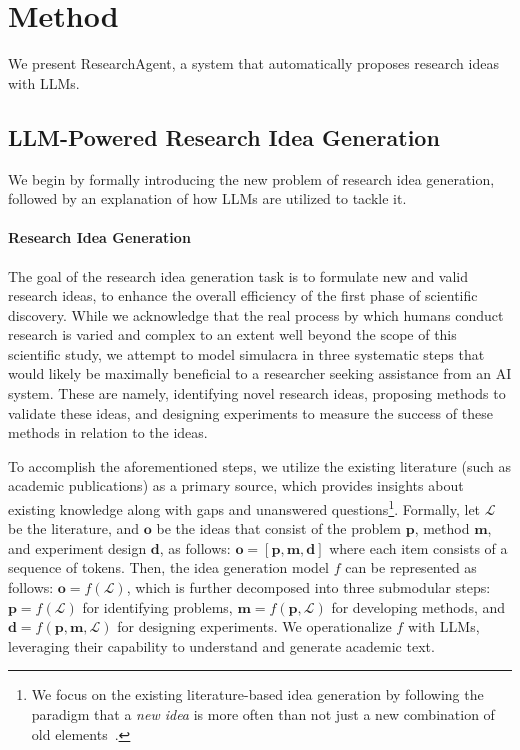 \documentclass[11pt]{article}
\def\vd{{\bm{d}}}
\def\vm{{\bm{m}}}
\def\vo{{\bm{o}}}
\def\vp{{\bm{p}}}
\begin{document}


\section{Method}
We present ResearchAgent, a system that automatically proposes research ideas with LLMs.

\subsection{LLM-Powered Research Idea Generation}
\label{sec:research-idea-gen}

We begin by formally introducing the new problem of research idea generation, followed by an explanation of how LLMs are utilized to tackle it.

\paragraph{Research Idea Generation}
The goal of the research idea generation task is to formulate new and valid research ideas, to enhance the overall efficiency of the first phase of scientific discovery. While we acknowledge that the real process by which humans conduct research is varied and complex to an extent well beyond the scope of this scientific study, we attempt to model simulacra in three systematic steps that would likely be maximally beneficial to a researcher seeking assistance from an AI system. These are namely, identifying novel research ideas, proposing methods to validate these ideas, and designing experiments to measure the success of these methods in relation to the ideas.

To accomplish the aforementioned steps, we utilize the existing literature (such as academic publications) as a primary source, which provides insights about existing knowledge along with gaps and unanswered questions\footnote{We focus on the existing literature-based idea generation by following the paradigm that a \textit{new idea} is more often than not just a new combination of old elements~\cite{young2003technique}.}. Formally, let $\mathcal{L}$ be the literature, and $\vo$ be the ideas that consist of the problem $\vp$, method $\vm$, and experiment design $\vd$, as follows: $\vo = [\vp, \vm, \vd]$ where each item consists of a sequence of tokens. Then, the idea generation model $f$ can be represented as follows: $\vo = f(\mathcal{L})$, which is further decomposed into three submodular steps: $\vp = f(\mathcal{L})$ for identifying problems, $\vm = f(\vp, \mathcal{L})$ for developing methods, and $\vd = f(\vp, \vm, \mathcal{L})$ for designing experiments. We operationalize $f$ with LLMs, leveraging their capability to understand and generate academic text. 
\end{document}
